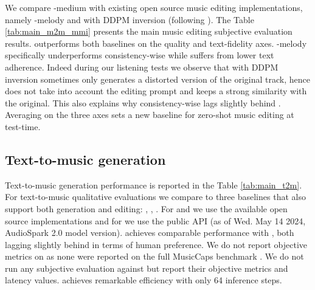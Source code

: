We compare \proposed-medium with existing open source music editing implementations, namely \musicgen-melody 
and  with DDPM inversion (following \citet{manor2024zero}).
The Table \ref{tab:main_m2m_mmi} presents the main music editing subjective evaluation results.
\proposed outperforms both baselines on the quality and text-fidelity axes.
\musicgen-melody specifically underperforms consistency-wise while  suffers from lower text adherence.
Indeed during our listening tests we observe that  with DDPM inversion sometimes only generates a distorted version of the original track, hence does not take into account the editing prompt and keeps a strong similarity with the original.
This also explains why consistency-wise \proposed lags slightly behind .
Averaging on the three axes \proposed sets a new baseline for zero-shot music editing at test-time.

\subsection{Text-to-music generation}
Text-to-music generation performance is reported in the Table \ref{tab:main_t2m}.
For text-to-music qualitative evaluations we compare \proposed to three baselines that also support both generation and editing: \musicgen, , \stableaudio.
For \musicgen and  we use the available open source implementations and for \stableaudio we use the public API (as of Wed. May 14 2024, AudioSpark 2.0 model version).
\proposed achieves comparable performance with \musicgen, both lagging slightly behind \stableaudio in terms of human preference.
We do not report objective metrics on \stableaudio as none were reported on the full MusicCaps benchmark \cite{evans2024fast}.
We do not run any subjective evaluation against \magnet but report their objective metrics and latency values.
\proposed achieves remarkable efficiency with only 64 inference steps.

